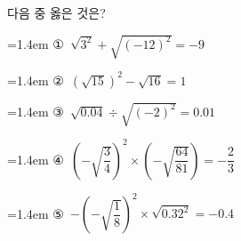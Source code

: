 다음 중 옳은 것은?
\par\medskip\par\noindent\hangindent=1.4em {\small ①}\ $\sqrt{3^2}+\sqrt{(-12)^2}=-9$\par\noindent\hangindent=1.4em {\small ②}\ $(\sqrt{15})^2-\sqrt{16}=1$\par\noindent\hangindent=1.4em {\small ③}\ $\sqrt{0.04}\div\sqrt{(-2)^2}=0.01$\par\noindent\hangindent=1.4em {\small ④}\ $\left(-\sqrt{\dfrac{3}{4}}\right)^2\times\left(-\sqrt{\dfrac{64}{81}}\right)=-\dfrac{2}{3}$\par\noindent\hangindent=1.4em {\small ⑤}\ $-\left(-\sqrt{\dfrac{1}{8}}\right)^2\times\sqrt{0.32^2}=-0.4$\par\medskip
